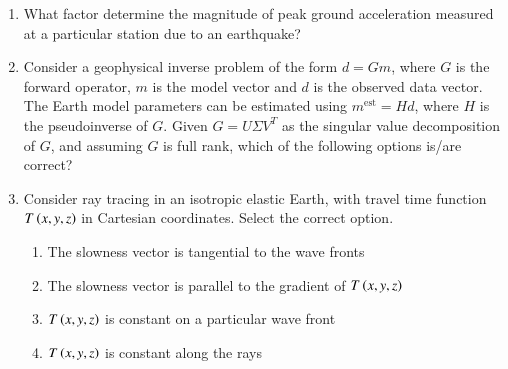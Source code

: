 \documentclass[journal,12pt,onecolumn]{IEEEtran}
\theoremstyle{remark}
\begin{document}
\begin{enumerate}
\item What factor determine the magnitude of peak ground acceleration measured at a particular station due to an earthquake? \hfill{}
\begin{enumerate}
\end{enumerate}

\item Consider a geophysical inverse problem of the form $d=Gm$, where $G$ is the forward operator, $m$ is the model vector and $d$ is the observed data vector. The Earth model parameters can be estimated using $m^{\text{est}}=Hd$, where $H$ is the pseudoinverse of $G$. Given $G=U\Sigma V^T$ as the singular value decomposition of $G$, and assuming $G$ is full rank, which of the following options is/are correct? \hfill{}
\begin{enumerate}
\end{enumerate}

\item Consider ray tracing in an isotropic elastic Earth, with travel time function $T\left(x,y,z\right)$ in Cartesian coordinates. Select the correct option. \hfill{}
\begin{enumerate}
    \item The slowness vector is tangential to the wave fronts
    \item The slowness vector is parallel to the gradient of $T\left(x,y,z\right)$
    \item $T\left(x,y,z\right)$ is constant on a particular wave front
    \item $T\left(x,y,z\right)$ is constant along the rays
\end{enumerate}


\end{enumerate}
\end{document}
